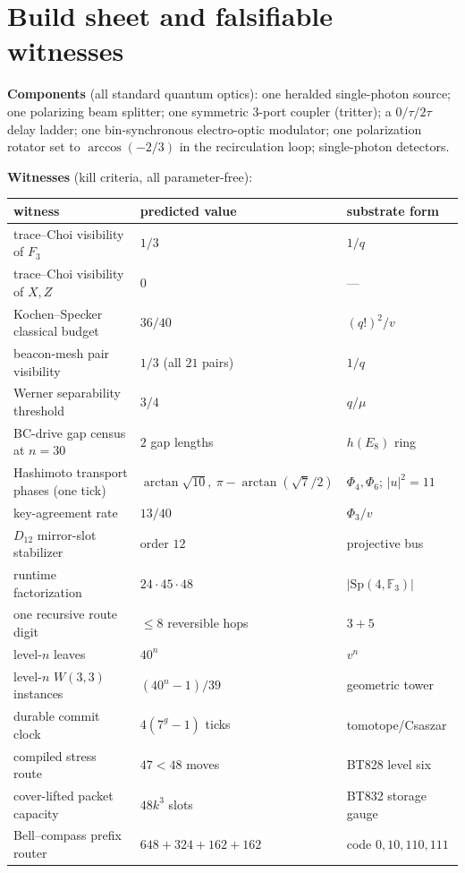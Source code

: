 \documentclass[11pt]{article}
\newcommand{\W}{W(3,3)}
\newcommand{\GF}[1]{\mathbb{F}_{#1}}
\newcommand{\Sp}{\mathrm{Sp}}
\begin{document}
\section{Build sheet and falsifiable witnesses}

\textbf{Components} (all standard quantum optics): one heralded
single-photon source; one polarizing beam splitter; one symmetric
$3$-port coupler (tritter); a $0/\tau/2\tau$ delay ladder; one
bin-synchronous electro-optic modulator; one polarization rotator set
to $\arccos(-2/3)$ in the recirculation loop; single-photon detectors.

\textbf{Witnesses} (kill criteria, all parameter-free):
\begin{center}\small
\begin{tabular}{lll}
\toprule
witness & predicted value & substrate form\\
\midrule
trace--Choi visibility of $F_3$ & $1/3$ & $1/q$\\
trace--Choi visibility of $X,Z$ & $0$ & ---\\
Kochen--Specker classical budget & $36/40$ & $(q!)^2/v$\\
beacon-mesh pair visibility & $1/3$ (all $21$ pairs) & $1/q$\\
Werner separability threshold & $3/4$ & $q/\mu$\\
BC-drive gap census at $n{=}30$ & $2$ gap lengths & $h(E_8)$ ring\\
Hashimoto transport phases (one tick) & $\arctan\sqrt{10},\ \pi-\arctan(\sqrt7/2)$ & $\Phi_4,\Phi_6$; $|u|^2=11$\\
key-agreement rate & $13/40$ & $\Phi_3/v$\\
$D_{12}$ mirror-slot stabilizer & order $12$ & projective bus\\
runtime factorization & $24\cdot45\cdot48$ & $|\Sp(4,\GF3)|$\\
one recursive route digit & $\le 8$ reversible hops & $3+5$\\
level-$n$ leaves & $40^n$ & $v^n$\\
level-$n$ $\W$ instances & $(40^n-1)/39$ & geometric tower\\
durable commit clock & $4(7^g-1)$ ticks & tomotope/Csaszar\\
compiled stress route & $47<48$ moves & BT828 level six\\
cover-lifted packet capacity & $48k^3$ slots & BT832 storage gauge\\
Bell--compass prefix router & $648+324+162+162$ & code $0,10,110,111$\\

\end{tabular}
\end{center}
\end{document}
